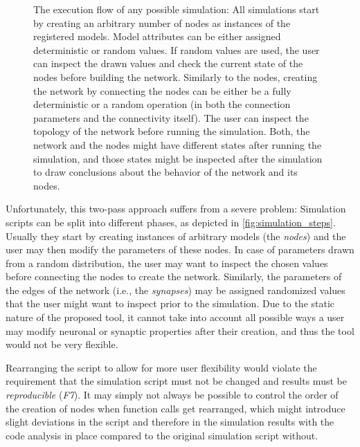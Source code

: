 \begin{figure}[ht!]
    \caption{The execution flow of any possible simulation: All simulations start by creating an arbitrary number of nodes as instances of the registered models. Model attributes can be either assigned deterministic or random values. If random values are used, the user can inspect the drawn values and check the current state of the nodes before building the network. Similarly to the nodes, creating the network by connecting the nodes can be either be a fully deterministic or a random operation (in both the connection parameters and the connectivity itself). The user can inspect the topology of the network before running the simulation. Both, the network and the nodes might have different states after running the simulation, and those states might be inspected after the simulation to draw conclusions about the behavior of the network and its nodes.}
    \label{fig:simulation_steps}
\end{figure}



Unfortunately, this two-pass approach suffers from a severe problem: Simulation scripts can be split into different phases, as depicted in \autoref{fig:simulation_steps}. Usually they start by creating instances of arbitrary models (the \emph{nodes}) and the user may then modify the parameters of these nodes. In case of parameters drawn from a random distribution, the user may want to inspect the chosen values before connecting the nodes to create the network. Similarly, the parameters of the edges of the network (i.e., the \emph{synapses}) may be assigned randomized values that the user might want to inspect prior to the simulation. Due to the static nature of the proposed tool, it cannot take into account all possible ways a user may modify neuronal or synaptic properties after their creation, and thus the tool would not be very flexible.

Rearranging the script to allow for more user flexibility would violate the requirement that the simulation script must not be changed and results must be \emph{reproducible} (\emph{F7}). It may simply not always be possible to control the order of the creation of nodes when function calls get rearranged, which might introduce slight deviations in the script and therefore in the simulation results with the code analysis in place compared to the original simulation script without.

